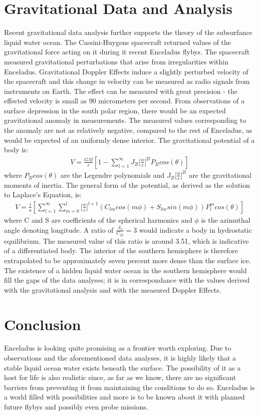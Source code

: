 \documentclass{article}
\begin{document}
\section{Gravitational Data and Analysis}
Recent gravitational data analysis further supports the theory of the
subsurfance liquid water ocean. The Cassini-Huygens spacecraft returned
values of the gravitational force acting on it during it recent
Enceladus flybys. The spacecraft measured gravitational perturbations that
arise from irregularities within Enceladus. Gravitational Doppler
Effects induce a slightly perturbed velocity of the spacecraft and this
change in velocity can be measured as radio signals from instruments on
Earth. The effect can be measured with great precision - the effected
velocity is small as 90 micrometers per second. From observations of a
surface depression in the south polar region, there would be an expected
gravitational anomaly in measurements. The measured values corresponding
to the anomaly are not as relatively negative, compared to the rest of
Enceladus, as would be expected of an uniformly dense interior. The
gravitational potential of a body is:
\begin{align}V = \frac{GM}{r}[1-\sum\limits_{l=1}^\infty
  J_{2l}\big[\frac{a}{r}\big]^{2l}P_{2l}cos(\theta)] 
\end{align}
where $P_{2l}cos(\theta)$ are the Legendre polynomials and
$J_{2l}\big[\frac{a}{r}\big]^{2l}$ are the gravitational moments of
inertia. The general form of the potential, as derived as the solution
to Laplace's Equation, is:
\begin{align}V = \frac{1}{a}[\sum\limits_{l=1}^\infty\sum\limits_{m=0}^l 
  \big[\frac{a}{r}\big]^{l+1}(C_{lm}cos(m\phi) +
  S_{lm}sin(m\phi))P_{l}^{m}cos(\theta)] 
\end{align}
where C and S are coefficients of the spherical harmonics and $\phi$ is
the azimuthal angle denoting longitude. A ratio of $\frac{J_{2}}{C_{22}}
= 3$ would indicate a body in hydrostatic equilibrium. The measured
value of this ratio is around 3.51, which is indicative of a
differentiated body. The interior of the southern hemisphere is
therefore extrapolated to be approximately seven percent more dense than
the surface ice. The existence of a hidden liquid water ocean in the
southern hemisphere would fill the gaps of the data analyses; it is in
correspondance with the values derived with the gravitational analysis
and with the measured Doppler Effects. 
\section{Conclusion}
Enceladus is looking quite promising as a frontier worth exploring. Due
to observations and the aforementioned data analyses, it is highly
likely that a stable liquid ocean water exists beneath the surface. The
possibility of it as a host for life is also realistic since, as far as
we know, there are no significant barriers from preventing it from
maintaining the conditions to do so. Enceladus is a world filled with
possibilities and more is to be known about it with planned future
flybys and possibly even probe missions.
\end{document}
